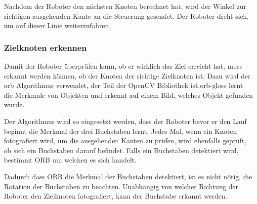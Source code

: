 Nachdem der Roboter den nächsten Knoten berechnet hat, wird der Winkel zur richtigen ausgehenden Kante an die Steuerung gesendet. Der Roboter dreht sich, um auf dieser Linie weiterzufahren.

\subsubsection{Zielknoten erkennen}

Damit der Roboter überprüfen kann, ob er wirklich das Ziel erreicht hat, muss erkannt werden können, ob der Knoten der richtige Zielknoten ist. Dazu wird der \acrfull{orb} Algorithmus verwendet, der Teil der OpenCV Bibliothek ist.\gls{orb-gloss} lernt die Merkmale von Objekten und erkennt auf einem Bild, welches Objekt gefunden wurde.

Der Algorithmus wird so eingesetzt werden, dass der Roboter bevor er den Lauf beginnt die Merkmal der drei Buchstaben lernt. Jedes Mal, wenn ein Knoten fotografiert wird, um die ausgehenden Kanten zu prüfen, wird ebenfalls geprüft, ob sich ein Buchstaben darauf befindet. Falls ein Buchstaben detektiert wird, bestimmt ORB um welchen es sich handelt.

Dadurch dass ORB die Merkmal der Buchstaben detektiert, ist es nicht nötig, die Rotation der Buchstaben zu beachten. Unabhängig von welcher Richtung der Roboter den Zielknoten fotografiert, kann der Buchstabe erkannt werden.

